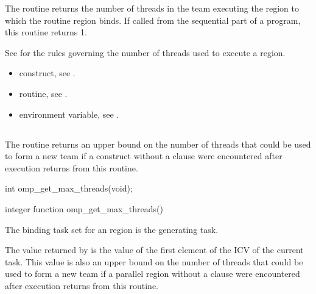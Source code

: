 \effect
The  routine returns the number of threads in the team 
executing the  region to which the routine region binds. If called from the 
sequential part of a program, this routine returns 1. 

See  
for the rules governing the number of threads used to 
execute a  region. 

\crossreferences
\begin{itemize}
\item {} construct, see 
.

\item {} routine, see 
.

\item {} environment variable, see 
.
\end{itemize}










\subsection{}
\label{subsec:omp_get_max_threads}
\summary
The  routine returns an upper bound on the number of 
threads that could be used to form a new team if a  construct without a 
 clause were encountered after execution returns from this routine.

\pagebreak
\format
\ccppspecificstart
\begin{boxedcode}
int omp\_get\_max\_threads(void);
\end{boxedcode}
\ccppspecificend

\fortranspecificstart
\begin{boxedcode}
integer function omp\_get\_max\_threads()
\end{boxedcode}
\fortranspecificend

\binding
The binding task set for an  region is the generating task. 

\effect
The value returned by  is the value of the first element of 
the  ICV of the current task. This value is also an upper bound on the 
number of threads that could be used to form a new team if a parallel region without a 
 clause were encountered after execution returns from this routine.

